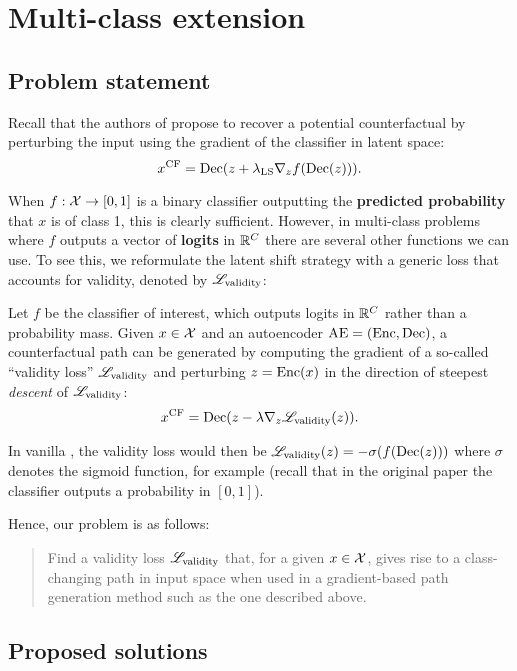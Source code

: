 \documentclass[../main.tex]{subfiles}
\begin{document}
\section{Multi-class extension}

\subsection{Problem statement}

Recall that the authors of \ls{} propose to recover a potential counterfactual by perturbing the input using the gradient of the classifier in latent space:
\begin{equation*}
    x^\mathrm{CF} = \operatorname{Dec}(z + \lambda_\text{LS} \nabla_z f(\operatorname{Dec}(z))).
\end{equation*}

When $f: \mathcal{X} \to [0, 1]$ is a binary classifier outputting the \textbf{predicted probability} that $x$ is of class 1, this is clearly sufficient.
However, in multi-class problems where $f$ outputs a vector of \textbf{logits} in $\mathbb{R}^C$ there are several other functions we can use.
To see this, we reformulate the latent shift strategy with a generic loss that accounts for validity, denoted by $\mathscr{L}_\text{validity}$:

Let $f$ be the classifier of interest, which outputs logits in $\mathbb{R}^C$ rather than a probability mass.
Given $x \in \mathcal{X}$ and an autoencoder $\mathrm{AE} = (\operatorname{Enc}, \operatorname{Dec})$, a counterfactual path can be generated by computing the gradient of a so-called ``validity loss'' $\mathscr{L}_\text{validity}$ and perturbing $z = \operatorname{Enc}(x)$ in the direction of steepest \emph{descent} of $\mathscr{L}_\text{validity}$:
\begin{equation*}
x^\mathrm{CF} = \operatorname{Dec}(z - \lambda \nabla_z \mathscr{L}_\text{validity}(z)).
\end{equation*}

In vanilla \ls{}, the validity loss would then be $\mathscr{L}_\text{validity}(z) = - \sigma(f(\operatorname{Dec}(z)))$ where $\sigma$ denotes the sigmoid function, for example (recall that in the original paper
the classifier outputs a probability in $[0, 1]$).

Hence, our problem is as follows:
\begin{quote}
Find a validity loss $\mathscr{L}_\text{validity}$ that, for a given $x \in \mathcal{X}$, gives rise to a class-changing path in input space when used in a gradient-based path generation method such as the one described above.
\end{quote}

\subsection{Proposed solutions}
\label{sec:validity_losses}
\end{document}
